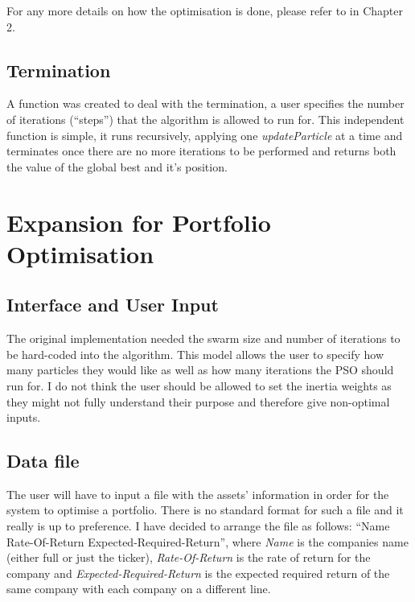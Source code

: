 \documentclass{pdfmx4020}
\begin{document}
    For any more details on how the optimisation is done, please refer to  in Chapter 2.
    \subsection{Termination} %
    \label{sub:termination}
    A function was created to deal with the termination, a user specifies the number of iterations (``steps'') that the algorithm is allowed to run for. This independent function is simple, it runs recursively, applying one \textit{updateParticle} at a time and terminates once there are no more iterations to be performed and returns both the value of the global best and it's position. 

  \section{Expansion for Portfolio Optimisation} %
  \label{sec:expansion_for_portfolio_optimisation}

    \subsection{Interface and User Input} %
    \label{sub:interface_and_user_input}
    The original implementation needed the swarm size and number of iterations to be hard-coded into the algorithm. This model allows the user to specify how many particles they would like as well as how many iterations the PSO should run for. I do not think the user should be allowed to set the inertia weights as they might not fully understand their purpose and therefore give non-optimal inputs.
    \subsection{Data file} %
    \label{sub:data_file}
    The user will have to input a file with the assets' information in order for the system to optimise a portfolio. There is no standard format for such a file and it really is up to preference. I have decided to arrange the file as follows: ``Name Rate-Of-Return Expected-Required-Return'', where \textit{Name} is the companies name (either full or just the ticker), \textit{Rate-Of-Return} is the rate of return for the company and \textit{Expected-Required-Return} is the expected required return of the same company with each company on a different line. 
\end{document}
